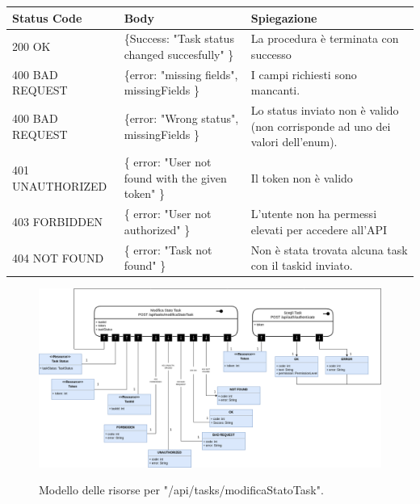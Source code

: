 \documentclass{report}
\begin{document}
\begin{center} %
	\centering
	\begin{tabular}{ |p{4cm}|p{4cm}|p{4cm}| }
		\hline
		\centering Status Code & \qquad\qquad\quad Body                             & \qquad\quad Spiegazione                                                       \\ %
		\hline
		200 OK                 & \{Success: "Task status changed succesfully" \}    & La procedura è terminata con successo                                         \\
		\hline
		400 BAD REQUEST        & \{error: "missing fields", missingFields \}        & I campi richiesti sono mancanti.                                              \\
		\hline
		400 BAD REQUEST        & \{error: "Wrong status", missingFields \}          & Lo status inviato non è valido (non corrisponde ad uno dei valori dell'enum). \\
		\hline
		401 UNAUTHORIZED       & \{ error: "User not found with the given token" \} & Il token non è valido                                                         \\
		\hline
		403 FORBIDDEN          & \{ error: "User not authorized" \}                 & L'utente non ha permessi elevati per accedere all'API                         \\
		\hline
		404 NOT FOUND          & \{ error: "Task not found" \}                      & Non è stata trovata alcuna task con il taskid inviato.                        \\
		\hline
	\end{tabular}
\end{center}

\begin{figure}[H]
	\centering\includegraphics[width=1\textwidth]{images/model_modifica_task.png}

	Modello delle risorse per "/api/tasks/modificaStatoTask".
\end{figure}
\end{document}
